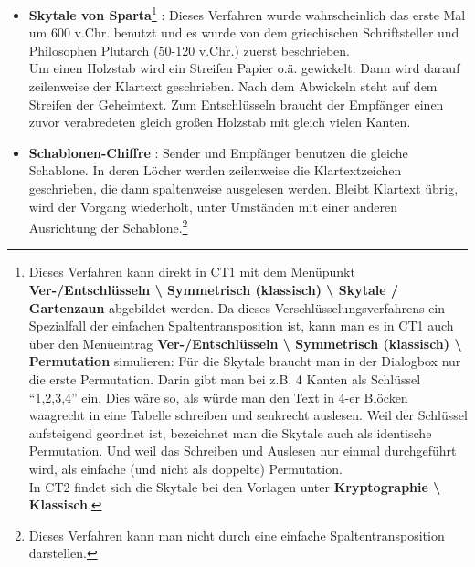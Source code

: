 \begin{refsegment}
\begin{itemize}
\item \textbf{Skytale von Sparta}\footnote{%
    Dieses Verfahren kann direkt in CT1 mit dem Menüpunkt
    \textbf{Ver-/Entschlüsseln \textbackslash{} Symmetrisch (klassisch)
    \textbackslash{} Skytale / Gartenzaun} abgebildet werden.
    Da dieses Verschlüsselungsverfahrens ein Spezialfall der einfachen
    Spaltentransposition ist, kann man es in CT1 auch
    über den Menüeintrag \textbf{Ver-/Entschlüsseln \textbackslash{}
    Symmetrisch (klassisch) \textbackslash{} Permutation} simulieren: Für die
    Skytale braucht man in der Dialogbox nur die erste Permutation. Darin gibt
    man bei z.B. 4 Kanten als Schlüssel  "`1,2,3,4"'  ein. Dies wäre so, als
    würde man den Text in 4-er Blöcken waagrecht in eine Tabelle schreiben und
    senkrecht auslesen.
    Weil der Schlüssel aufsteigend geordnet ist, bezeichnet man die Skytale
    auch als identische Permutation. Und weil das Schreiben und Auslesen nur
    einmal durchgeführt wird, als einfache (und nicht als doppelte) Permutation.\\
    In CT2 findet sich die Skytale bei den Vorlagen unter
    \textbf{Kryptographie \textbackslash{} Klassisch}.
   }
   \cite{Singh2001}%
   :
   Dieses Verfahren wurde wahrscheinlich das erste Mal um 600 v.Chr.
   benutzt und es wurde von dem griechischen Schriftsteller und Philosophen
   Plutarch (50-120 v.Chr.) zuerst beschrieben.\\
   Um einen Holzstab wird ein Streifen Papier o.ä. gewickelt. Dann wird
   darauf zeilenweise der Klartext geschrieben. Nach dem Abwickeln steht
   auf dem Streifen der Geheimtext. Zum Entschlüsseln braucht der Empfänger
   einen zuvor verabredeten gleich großen Holzstab mit gleich vielen Kanten.


\item \textbf{Schablonen-Chiffre} \cite{Goebel2014}: Sender und Empfänger
   benutzen die gleiche Schablone. In deren Löcher werden zeilenweise die
   Klartextzeichen geschrieben, die dann spaltenweise ausgelesen werden.
   Bleibt Klartext übrig, wird der Vorgang wiederholt, unter Umständen
   mit einer anderen Ausrichtung der Schablone.\footnote{%
   Dieses Verfahren kann man nicht durch eine einfache Spaltentransposition
   darstellen.}



\end{itemize}
\end{refsegment}
